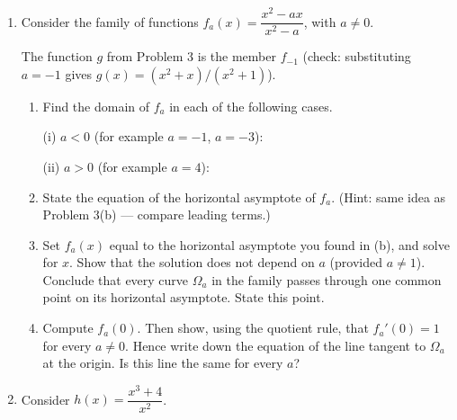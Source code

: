 \documentclass[12pt, twoside]{article}
\begin{document}
\begin{enumerate}[itemsep=0.4cm]
\begin{figure}[H]
\begin{center}
\begin{tikzpicture}[scale=0.8]
\end{tikzpicture}
\end{center}
\end{figure}

\newpage

\item[4.] Consider the family of functions
$\displaystyle f_a(x)=\dfrac{x^2-ax}{x^2-a}$, with $a\ne 0$.

The function $g$ from Problem 3 is the member $f_{-1}$
(check: substituting $a=-1$ gives $g(x)=(x^2+x)/(x^2+1)$).

\begin{enumerate}[label=(\alph*), itemsep=0.3cm]
  \item Find the domain of $f_a$ in each of the following cases.

  \vspace{0.2cm}

  \quad (i) $a<0$ (for example $a=-1$, $a=-3$):
  \vspace{1.0cm}

  \quad (ii) $a>0$ (for example $a=4$):
  \vspace{1.0cm}

  \item State the equation of the horizontal asymptote of $f_a$.
  (Hint: same idea as Problem 3(b) --- compare leading terms.)

  \vspace{1.6cm}

  \item Set $f_a(x)$ equal to the horizontal asymptote you found in
  (b), and solve for $x$. Show that the solution does not depend
  on $a$ (provided $a\ne 1$). Conclude that every curve $\Omega_a$
  in the family passes through one common point on its horizontal
  asymptote. State this point.

  \vspace{4.5cm}

  \item Compute $f_a(0)$. Then show, using the quotient rule, that
  $f_a'(0)=1$ for every $a\ne 0$. Hence write down the equation
  of the line tangent to $\Omega_a$ at the origin. Is this line
  the same for every $a$?

  \vspace{4cm}
\end{enumerate}

\newpage

\item[5.] Consider $\displaystyle h(x)=\dfrac{x^3+4}{x^2}$.


\end{enumerate}
\end{document}
